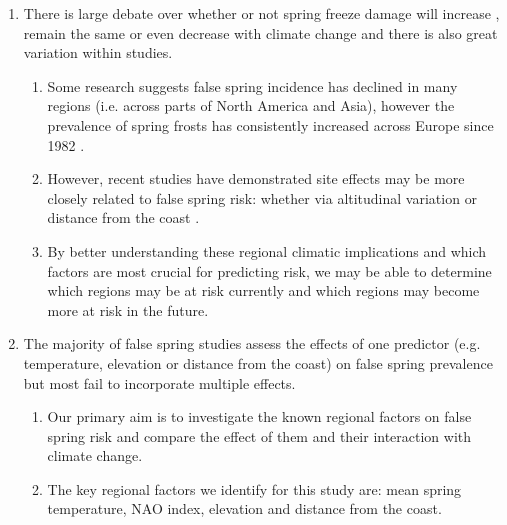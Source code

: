 \documentclass{article}\usepackage[]{graphicx}\usepackage[]{color}
\begin{document}
\begin{enumerate}
\item There is large debate over whether or not spring freeze damage will increase \citep{Hannenin1991, Augspurger2013, Labe2016}, remain the same \citep{Scheifinger2003} or even decrease \citep{Kramer1994, Vitra2017} with climate change and there is also great variation within studies. %
\begin{enumerate}
\item Some research suggests false spring incidence has declined in many regions (i.e. across parts of North America and Asia), however the prevalence of spring frosts has consistently increased across Europe since 1982 \citep{Liu2018}.
\item However, recent studies have demonstrated site effects may be more closely related to false spring risk: whether via altitudinal variation \citep{Vitra2017, Ma2018} or distance from the coast \citep{Wypych2016a, Ma2018}.
\item By better understanding these regional climatic implications and which factors are most crucial for predicting risk, we may be able to determine which regions may be at risk currently and which regions may become more at risk in the future.
\end{enumerate}

\item The majority of false spring studies assess the effects of one predictor (e.g. temperature, elevation or distance from the coast) on false spring prevalence but most fail to incorporate multiple effects. 
\begin{enumerate}
\item Our primary aim is to investigate the known regional factors on false spring risk and compare the effect of them and their interaction with climate change. 
\item The key regional factors we identify for this study are: mean spring temperature, NAO index, elevation and distance from the coast.
\end{enumerate}


\end{enumerate}
\end{document}
